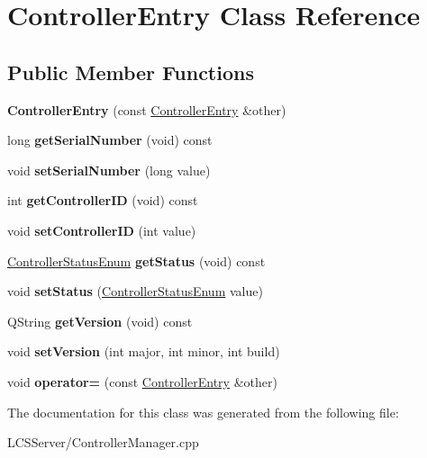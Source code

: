 \hypertarget{class_controller_entry}{}\section{Controller\+Entry Class Reference}
\label{class_controller_entry}
\subsection*{Public Member Functions}
\begin{DoxyCompactItemize}
\item 
\mbox{\label{class_controller_entry_a26793ef5e3046aba4d50a10faf4a3d28}} 
{\bfseries Controller\+Entry} (const \hyperlink{class_controller_entry}{Controller\+Entry} \&other)
\item 
\mbox{\label{class_controller_entry_af209c8df410096b335c3eda85cb13cbe}} 
long {\bfseries get\+Serial\+Number} (void) const
\item 
\mbox{\label{class_controller_entry_a71eea08af0193dca797148f8dc375143}} 
void {\bfseries set\+Serial\+Number} (long value)
\item 
\mbox{\label{class_controller_entry_a118aec7c94dfddb49a0c4753cd7fc482}} 
int {\bfseries get\+Controller\+ID} (void) const
\item 
\mbox{\label{class_controller_entry_ad25f5d4cd7c78d8bfaa94b6bd4930c1b}} 
void {\bfseries set\+Controller\+ID} (int value)
\item 
\mbox{\label{class_controller_entry_a5b981f25f7e3a9a50817a70959096766}} 
\hyperlink{_global_defs_8h_a51207b6a49e0da6f9978a3019d93480a}{Controller\+Status\+Enum} {\bfseries get\+Status} (void) const
\item 
\mbox{\label{class_controller_entry_a3b937ec9d808aacc509304ab0fa58959}} 
void {\bfseries set\+Status} (\hyperlink{_global_defs_8h_a51207b6a49e0da6f9978a3019d93480a}{Controller\+Status\+Enum} value)
\item 
\mbox{\label{class_controller_entry_ab3897317445003f2776d4c3ae54f621f}} 
Q\+String {\bfseries get\+Version} (void) const
\item 
\mbox{\label{class_controller_entry_a2eb241a6eacde27c5d2f23e71104f210}} 
void {\bfseries set\+Version} (int major, int minor, int build)
\item 
\mbox{\label{class_controller_entry_ab761e0059786897f281c3ef9d03d80fe}} 
void {\bfseries operator=} (const \hyperlink{class_controller_entry}{Controller\+Entry} \&other)
\end{DoxyCompactItemize}


The documentation for this class was generated from the following file\+:\begin{DoxyCompactItemize}
\item 
L\+C\+S\+Server/Controller\+Manager.\+cpp\end{DoxyCompactItemize}

